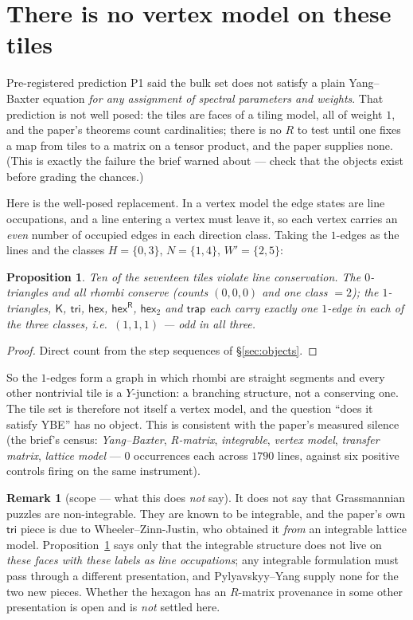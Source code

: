\documentclass[11pt]{article}
\newtheorem{proposition}[theorem]{Proposition}
\theoremstyle{definition}
\newtheorem{remark}[theorem]{Remark}
\newcommand{\hex}{\mathsf{hex}}
\newcommand{\hexR}{\mathsf{hex}^{\mathsf{R}}}
\newcommand{\trap}{\mathsf{trap}}
\newcommand{\Ktile}{\mathsf{K}}
\newcommand{\tritile}{\mathsf{tri}}
\begin{document}
\section{There is no vertex model on these tiles}\label{sec:nomodel}

Pre-registered prediction P1 said the bulk set does not satisfy a plain
Yang--Baxter equation \emph{for any assignment of spectral parameters and
weights}. That prediction is not well posed: the tiles are faces of a tiling
model, all of weight $1$, and the paper's theorems count cardinalities; there is
no $R$ to test until one fixes a map from tiles to a matrix on a tensor
product, and the paper supplies none. (This is exactly the failure the brief
warned about --- check that the objects exist before grading the chances.)

Here is the well-posed replacement. In a vertex model the edge states are line
occupations, and a line entering a vertex must leave it, so each vertex carries
an \emph{even} number of occupied edges in each direction class. Taking the
$1$-edges as the lines and the classes $H=\{0,3\}$, $N=\{1,4\}$,
$W'=\{2,5\}$:

\begin{proposition}\label{prop:noconserve}
Ten of the seventeen tiles violate line conservation. The $0$-triangles and all
rhombi conserve (counts $(0,0,0)$ and one class $=2$); the $1$-triangles,
$\Ktile$, $\tritile$, $\hex$, $\hexR$, $\mathsf{hex}_2$ and $\trap$ each carry
exactly \emph{one} $1$-edge in each of the three classes, i.e.\ $(1,1,1)$ --- odd
in all three.
\end{proposition}

\begin{proof}
Direct count from the step sequences of \S\ref{sec:objects}.
\end{proof}

So the $1$-edges form a graph in which rhombi are straight segments and every
other nontrivial tile is a $Y$-junction: a branching structure, not a conserving
one. The tile set is therefore not itself a vertex model, and the question
``does it satisfy YBE'' has no object. This is consistent with the paper's
measured silence (the brief's census: \emph{Yang--Baxter}, \emph{R-matrix},
\emph{integrable}, \emph{vertex model}, \emph{transfer matrix},
\emph{lattice model} --- $0$ occurrences each across $1790$ lines, against six
positive controls firing on the same instrument).

\begin{remark}[scope --- what this does \emph{not} say]
It does not say that Grassmannian puzzles are non-integrable. They are known to
be integrable, and the paper's own $\tritile$ piece is due to
Wheeler--Zinn-Justin, who obtained it \emph{from} an integrable lattice model.
Proposition~\ref{prop:noconserve} says only that the integrable structure does
not live on \emph{these faces with these labels as line occupations}; any
integrable formulation must pass through a different presentation, and
Pylyavskyy--Yang supply none for the two new pieces. Whether the hexagon has an
$R$-matrix provenance in some other presentation is open and is \emph{not}
settled here.
\end{remark}
\end{document}
